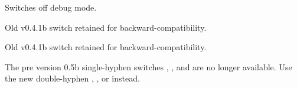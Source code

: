 
Switches off debug mode.


Old v0.4.1b switch retained for backward-compatibility.


Old v0.4.1b switch retained for backward-compatibility.

\begin{information}
The pre version 0.5b single-hyphen switches
,
,
 and
 are no longer available.
Use the new double-hyphen 
,
,
 or
 instead.
\end{information}

\printmain

\printindex


